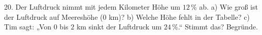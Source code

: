 \documentclass[11pt]{article}
\begin{document}
\begin{pfaufg}{}{20.}{}
Der Luftdruck nimmt mit jedem Kilometer Höhe um $12\,\%$ ab. a) Wie groß ist der Luftdruck auf Meereshöhe ($0$ km)? b) Welche Höhe fehlt in der Tabelle? c) Tim sagt: „Von $0$ bis $2$ km sinkt der Luftdruck um $24\,\%$.“ Stimmt das? Begründe. \newline{}
\end{pfaufg}

\par\vfill{}
\end{document}
